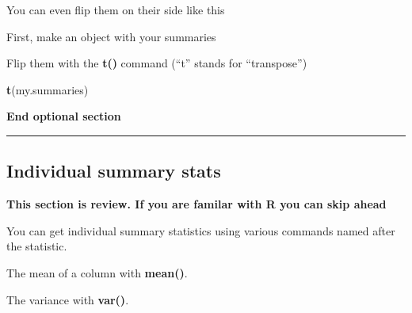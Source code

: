 \documentclass[]{book}
\newenvironment{Shaded}{\begin{snugshade}}{\end{snugshade}}
\newcommand{\KeywordTok}[1]{\textcolor[rgb]{0.13,0.29,0.53}{\textbf{#1}}}
\newcommand{\StringTok}[1]{\textcolor[rgb]{0.31,0.60,0.02}{#1}}
\newcommand{\OperatorTok}[1]{\textcolor[rgb]{0.81,0.36,0.00}{\textbf{#1}}}
\newcommand{\NormalTok}[1]{#1}
\theoremstyle{definition}
\theoremstyle{definition}
\theoremstyle{definition}
\theoremstyle{remark}
\begin{document}
You can even flip them on their side like this

First, make an object with your summaries

\begin{Shaded}
\end{Shaded}

Flip them with the \textbf{t()} command (``t'' stands for ``transpose'')

\begin{Shaded}
\begin{Highlighting}[]
\KeywordTok{t}\NormalTok{(my.summaries)}
\end{Highlighting}
\end{Shaded}

\textbf{End optional section}

\begin{center}\rule{0.5\linewidth}{\linethickness}\end{center}

\subsection{Individual summary stats}\label{individual-summary-stats}

\textbf{This section is review. If you are familar with R you can skip
ahead}

You can get individual summary statistics using various commands named
after the statistic.

The mean of a column with \textbf{mean()}.

\begin{Shaded}
\end{Shaded}

The variance with \textbf{var()}.

\begin{Shaded}
\end{Shaded}
\end{document}
